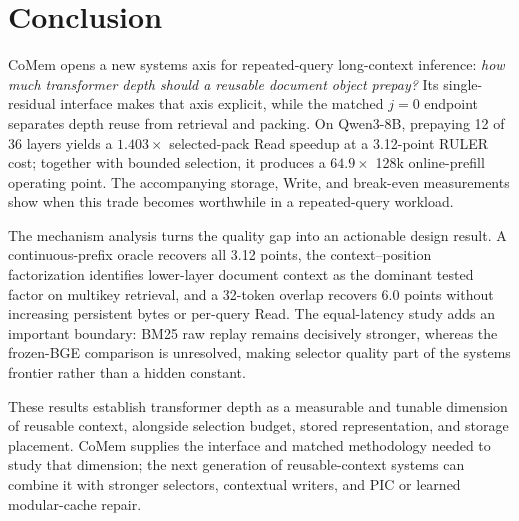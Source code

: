 \section{Conclusion}
\label{sec:conclusion}

CoMem opens a new systems axis for repeated-query long-context inference:
\emph{how much transformer depth should a reusable document object prepay?}
Its single-residual interface makes that axis explicit, while the matched
$j{=}0$ endpoint separates depth reuse from retrieval and packing. On
Qwen3-8B, prepaying 12 of 36 layers yields a $1.403\times$ selected-pack Read
speedup at a 3.12-point RULER cost; together with bounded selection, it produces
a $64.9\times$ 128k online-prefill operating point. The accompanying storage,
Write, and break-even measurements show when this trade becomes worthwhile in
a repeated-query workload.

The mechanism analysis turns the quality gap into an actionable design result.
A continuous-prefix oracle recovers all 3.12 points, the context--position
factorization identifies lower-layer document context as the dominant tested
factor on multikey retrieval, and a 32-token overlap recovers 6.0 points without
increasing persistent bytes or per-query Read. The equal-latency study adds an
important boundary: BM25 raw replay remains decisively stronger, whereas the
frozen-BGE comparison is unresolved, making selector quality part of the
systems frontier rather than a hidden constant.

These results establish transformer depth as a measurable and tunable dimension
of reusable context, alongside selection budget, stored representation, and
storage placement. CoMem supplies the interface and matched methodology needed
to study that dimension; the next generation of reusable-context systems can
combine it with stronger selectors, contextual writers, and PIC or learned
modular-cache repair.
